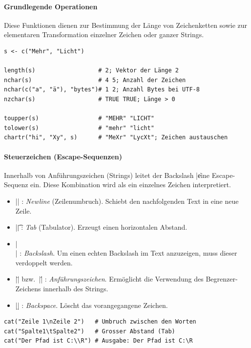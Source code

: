 \documentclass[10pt,twocolumn]{scrartcl}
\renewcommand{\lstinline}{\mycoloredinline}
\begin{document}
\paragraph{Grundlegende Operationen}

Diese Funktionen dienen zur Bestimmung der Länge von Zeichenketten sowie zur elementaren Transformation einzelner Zeichen oder ganzer Strings.

\begin{lstlisting}
s <- c("Mehr", "Licht")

length(s)                  # 2; Vektor der Länge 2
nchar(s)                   # 4 5; Anzahl der Zeichen
nchar(c("a", "ä"), "bytes")# 1 2; Anzahl Bytes bei UTF-8
nzchar(s)                  # TRUE TRUE; Länge > 0

toupper(s)                 # "MEHR" "LICHT"
tolower(s)                 # "mehr" "licht"
chartr("hi", "Xy", s)      # "MeXr" "LycXt"; Zeichen austauschen
\end{lstlisting}

\paragraph{Steuerzeichen (Escape-Sequenzen)}

Innerhalb von Anführungszeichen (Strings) leitet der Backslash \lstinline|\| eine Escape-Sequenz ein. Diese Kombination wird als ein einzelnes Zeichen interpretiert.

\begin{itemize}
\item \lstinline|\n| : \emph{Newline} (Zeilenumbruch). Schiebt den nachfolgenden Text in eine neue Zeile.
\item \lstinline|\t| : \emph{Tab} (Tabulator). Erzeugt einen horizontalen Abstand.
\item \lstinline|\\| : \emph{Backslash}. Um einen echten Backslash im Text anzuzeigen, muss dieser verdoppelt werden.
\item \lstinline|\"| bzw.\ \lstinline|\'| : \emph{Anführungszeichen}. Ermöglicht die Verwendung des Begrenzer-Zeichens innerhalb des Strings.
\item \lstinline|\b| : \emph{Backspace}. Löscht das vorangegangene Zeichen.
\end{itemize}

\begin{lstlisting}
cat("Zeile 1\nZeile 2")   # Umbruch zwischen den Worten
cat("Spalte1\tSpalte2")   # Grosser Abstand (Tab)
cat("Der Pfad ist C:\\R") # Ausgabe: Der Pfad ist C:\R
\end{lstlisting}
\end{document}
